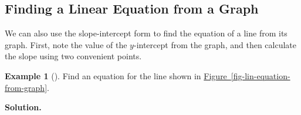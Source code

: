 \documentclass[10pt,]{book}
\theoremstyle{plain}
\theoremstyle{definition}
\theoremstyle{definition}
\newtheorem{example}[theorem]{Example}
\theoremstyle{definition}
\theoremstyle{definition}
\numberwithin{equation}{section}
\newcounter{figstack}
\newlength\fight
\newcommand\pushValignCaptionBottom[5][b]{%
\stepcounter{figstack}%
\expandafter\def\csname %
figalign\romannumeral\value{figstack}\endcsname{#1}%
\expandafter\def\csname %
figtype\romannumeral\value{figstack}\endcsname{#2}%
\expandafter\def\csname %
figwd\romannumeral\value{figstack}\endcsname{#3}%
\expandafter\def\csname %
figcontent\romannumeral\value{figstack}\endcsname{#4}%
\expandafter\def\csname %
figcap\romannumeral\value{figstack}\endcsname{#5}%
\setbox0=\hbox{%
\begin{#2}{#3}#4\end{#2}}%
\ifdim\dimexpr\ht0+\dp0\relax>\fight\global\setlength{\fight}{%
\dimexpr\ht0+\dp0\relax}\fi%
}
\begin{document}
\subsection[Finding a Linear Equation from a Graph]{Finding a Linear Equation from a Graph}\label{subsection-26}

        We can also use the slope-intercept form to find the equation of a line from its graph. First, note the value of the \(y\)-intercept from the graph, and then calculate the slope using two convenient points.
\begin{example}[]\label{example-lin-equation-from-graph}
Find an equation for the line shown in \hyperref[fig-lin-equation-from-graph]{Figure~\ref{fig-lin-equation-from-graph}}.%
\par\medskip\noindent%
\textbf{Solution.}\quad \leavevmode%
\end{example}
\end{document}
